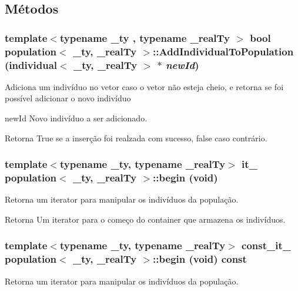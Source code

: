 \subsection{Métodos}
\hypertarget{classpopulation_a23a6d7fca0c7cbaffdcf6cb6cf3239a9}{
\subsubsection[{AddIndividualToPopulation}]{\setlength{\rightskip}{0pt plus 5cm}template$<$typename \_\-ty , typename \_\-realTy $>$ bool {\bf population}$<$ \_\-ty, \_\-realTy $>$::AddIndividualToPopulation ({\bf individual}$<$ \_\-ty, \_\-realTy $>$ $\ast$ {\em newId})}}
\label{classpopulation_a23a6d7fca0c7cbaffdcf6cb6cf3239a9}
Adiciona um indivíduo no vetor caso o vetor não esteja cheio, e retorna se foi possível adicionar o novo indivíduo

newId Novo indivíduo a ser adicionado.

\begin{DoxyReturn}{Retorna}
True se a inserção foi realzada com sucesso, false caso contrário. 
\end{DoxyReturn}
\hypertarget{classpopulation_a7c7bcf224b99227f6ab381dbc9f37c2c}{
\subsubsection[{begin}]{\setlength{\rightskip}{0pt plus 5cm}template$<$typename \_\-ty, typename \_\-realTy$>$ {\bf it\_\-} {\bf population}$<$ \_\-ty, \_\-realTy $>$::begin (void)}}
\label{classpopulation_a7c7bcf224b99227f6ab381dbc9f37c2c}
Retorna um iterator para manipular os indivíduos da população.

\begin{DoxyReturn}{Retorna}
Um iterator para o começo do container que armazena os indivíduos. 
\end{DoxyReturn}
\hypertarget{classpopulation_a4751584859b70770ae44717a43f9ab95}{
\subsubsection[{begin}]{\setlength{\rightskip}{0pt plus 5cm}template$<$typename \_\-ty, typename \_\-realTy$>$ {\bf const\_\-it\_\-} {\bf population}$<$ \_\-ty, \_\-realTy $>$::begin (void) const}}
\label{classpopulation_a4751584859b70770ae44717a43f9ab95}
Retorna um iterator para manipular os indivíduos da população.

